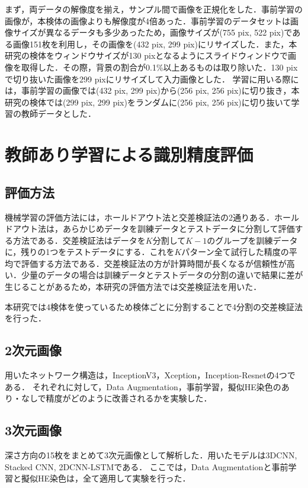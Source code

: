 まず，両データの解像度を揃え，サンプル間で画像を正規化をした．事前学習の画像が，本検体の画像よりも解像度が4倍あった．事前学習のデータセットは画像サイズが異なるデータも多少あったため，画像サイズが(755 pix, 522 pix)である画像151枚を利用し，その画像を(432 pix, 299 pix)にリサイズした．また，本研究の検体をウィンドウサイズが130 pixとなるようにスライドウィンドウで画像を取得した．その際，背景の割合が0.1\%以上あるものは取り除いた．130 pixで切り抜いた画像を299 pixにリサイズして入力画像とした．
学習に用いる際には，事前学習の画像では(432 pix, 299 pix)から(256 pix, 256 pix)に切り抜き，本研究の検体では(299 pix, 299 pix)をランダムに(256 pix, 256 pix)に切り抜いて学習の教師データとした．


\section{教師あり学習による識別精度評価}

\subsection{評価方法}
機械学習の評価方法には，ホールドアウト法と交差検証法の2通りある．ホールドアウト法は，あらかじめデータを訓練データとテストデータに分割して評価する方法である．交差検証法はデータを$K$分割して$K-1$のグループを訓練データに，残りの1つをテストデータにする．これを$K$パターン全て試行した精度の平均で評価する方法である．交差検証法の方が計算時間が長くなるが信頼性が高い．少量のデータの場合は訓練データとテストデータの分割の違いで結果に差が生じることがあるため，本研究の評価方法では交差検証法を用いた．

本研究では4検体を使っているため検体ごとに分割することで4分割の交差検証法を行った．

\subsection*{2次元画像}
用いたネットワーク構造は，InceptionV3，Xception，Inception-Resnetの4つである．
それぞれに対して，Data Augmentation，事前学習，擬似HE染色のあり・なしで精度がどのように改善されるかを実験した．

\subsection*{3次元画像}
深さ方向の15枚をまとめて3次元画像として解析した．用いたモデルは3DCNN, Stacked CNN, 2DCNN-LSTMである．
ここでは，Data Augmentationと事前学習と擬似HE染色は，全て適用して実験を行った．


